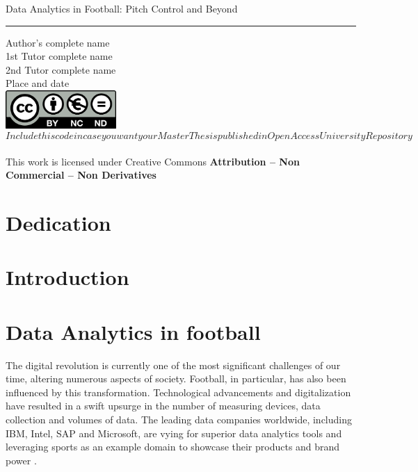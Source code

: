 \documentclass[twoside,nohyper]{tufte-book}
\begin{document}
Data Analytics in Football: Pitch Control and Beyond\\

\begin{center}\rule{0.5\linewidth}{0.5pt}\end{center}

\hfill\break
Author's complete name\\

1st Tutor complete name\\
2nd Tutor complete name\\
Place and date\\

\hfill\break
\includegraphics[width=4.2cm,height=\textheight]{imagenes/creativecommons.png}\\
\emph{\[Include this code in case you want your Master Thesis published in
Open Access University Repository\]}\\
This work is licensed under Creative Commons \textbf{Attribution -- Non
Commercial -- Non Derivatives}

\hypertarget{dedication}{%
\chapter*{Dedication}\label{dedication}}

\hypertarget{introduction}{%
\chapter{Introduction}\label{introduction}}

\hypertarget{data-analytics-in-football}{%
\chapter{Data Analytics in football}\label{data-analytics-in-football}}

The digital revolution is currently one of the most significant
challenges of our time, altering numerous aspects of society. Football,
in particular, has also been influenced by this transformation.
Technological advancements and digitalization have resulted in a swift
upsurge in the number of measuring devices, data collection and volumes
of data. The leading data companies worldwide, including IBM, Intel, SAP
and Microsoft, are vying for superior data analytics tools and
leveraging sports as an example domain to showcase their products and
brand power \citep{1}.
\end{document}
